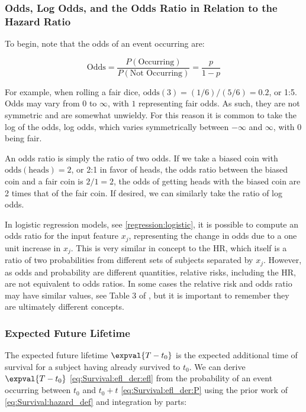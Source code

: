 \subsubsection{Odds, Log Odds, and the Odds Ratio in Relation to the Hazard Ratio}
\label{additional:Survival:additional:odds}

To begin, note that the odds of an event occurring are:

\begin{equation}\label{eq:Survival:odds}
\text{Odds} = \frac{P\left(\text{Occurring}\right)}{P\left(\text{Not Occurring}\right)} = \frac{p}{1-p}
\end{equation}

\noindent For example, when rolling a fair dice, $\text{odds}\left(3\right) = (1/6) / (5/6) = 0.2$, or 1:5.
Odds may vary from $0$ to $\infty$, with $1$ representing fair odds.
As such, they are not symmetric and are somewhat unwieldy.
For this reason it is common to take the log of the odds,
\ie log odds, which varies symmetrically between $-\infty$ and $\infty$, with 0 being fair.

An odds ratio is simply the ratio of two odds.
If we take a biased coin with $\text{odds}\left(\text{heads}\right) = 2$, or 2:1 in favor of heads,
the odds ratio between the biased coin and a fair coin is $2/1 = 2$,
\ie the odds of getting heads with the biased coin are 2 times that of the fair coin.
If desired, we can similarly take the ratio of log odds.

In logistic regression models, see \cref{regression:logistic},
it is possible to compute an odds ratio for the input feature $x_{j}$,
representing the change in odds due to a one unit increase in $x_{j}$.
This is very similar in concept to the HR,
which itself is a ratio of two probabilities from different sets of subjects separated by $x_{j}$.
However, as odds and probability are different quantities,
relative risks, including the HR, are not equivalent to odds ratios.
In some cases the relative risk and odds ratio may have similar values,
see Table 3 of \cite{pmid26623395},
but it is important to remember they are ultimately different concepts.

\subsubsection{Expected Future Lifetime}
\label{additional:Survival::additional:efl}

The expected future lifetime $\expval{T-t_{0}}$ is the
expected additional time of survival for a subject having already survived to $t_{0}$.
We can derive $\expval{T-t_{0}}$ \cref{eq:Survival:efl_der:efl}
from the probability of an event occurring between $t_{0}$ and $t_{0} + t$ \cref{eq:Survival:efl_der:P}
using the prior work of \cref{eq:Survival:hazard_def} and integration by parts:

